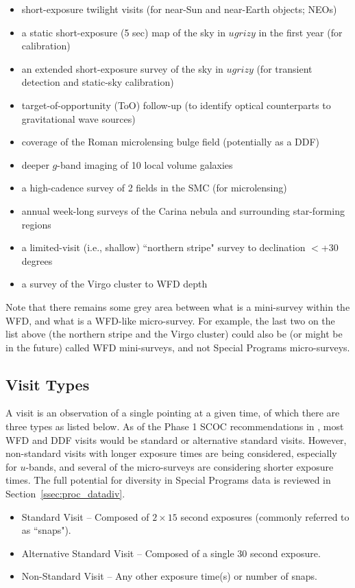 \documentclass[DM,lsstdoc,toc]{lsstdoc}
\begin{document}
\begin{itemize}
\item short-exposure twilight visits (for near-Sun and near-Earth objects; NEOs)
\item a static short-exposure (5 sec) map of the sky in $ugrizy$ in the first year (for calibration)
\item an extended short-exposure survey of the sky in $ugrizy$ (for transient detection and static-sky calibration)
\item target-of-opportunity (ToO) follow-up (to identify optical counterparts to gravitational wave sources)
\item coverage of the Roman microlensing bulge field (potentially as a DDF)
\item deeper $g$-band imaging of 10 local volume galaxies
\item a high-cadence survey of 2 fields in the SMC (for microlensing)
\item annual week-long surveys of the Carina nebula and surrounding star-forming regions
\item a limited-visit (i.e., shallow) ``northern stripe" survey to declination $<$+30 degrees
\item a survey of the Virgo cluster to WFD depth
\end{itemize}

Note that there remains some grey area between what is a mini-survey within the WFD, and what is a WFD-like micro-survey.
For example, the last two on the list above (the northern stripe and the Virgo cluster) could also be (or might be in the future) called WFD mini-surveys, and not Special Programs micro-surveys.

\subsection{Visit Types}\label{ssec:terms_visits}
A visit is an observation of a single pointing at a given time, of which there are three types as listed below.
As of the Phase 1 SCOC recommendations in , most WFD and DDF visits would be standard or alternative standard visits.
However, non-standard visits with longer exposure times are being considered, especially for $u$-bands, and several of the micro-surveys are considering shorter exposure times.
The full potential for diversity in Special Programs data is reviewed in Section~\ref{ssec:proc_datadiv}.

\begin{itemize}
\item Standard Visit -- Composed of $2\times15$ second exposures (commonly referred to as ``snaps").
\item Alternative Standard Visit -- Composed of a single $30$ second exposure.
\item Non-Standard Visit -- Any other exposure time(s) or number of snaps.
\end{itemize}
\end{document}
